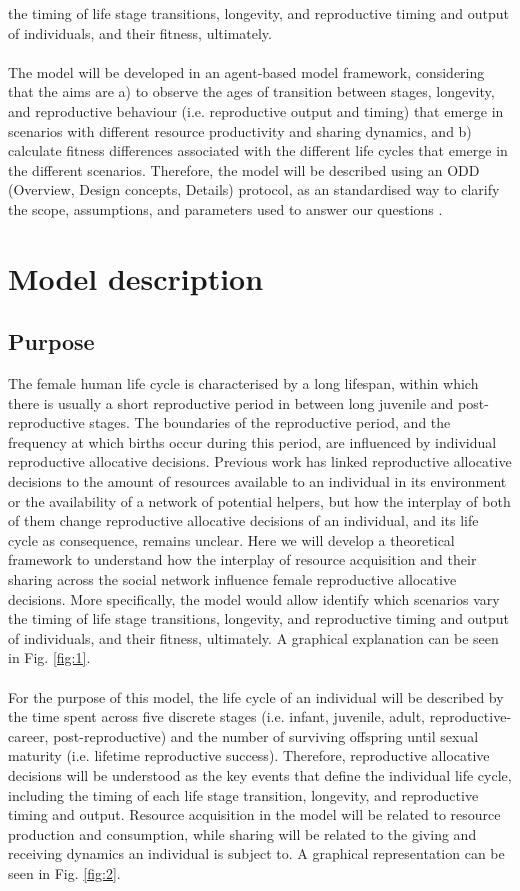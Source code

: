\documentclass{article}
\begin{document}
the timing of life stage transitions, longevity, and reproductive timing and output of individuals, and their fitness, ultimately.
\\\\
The model will be developed in an agent-based model framework, considering that the aims are a) to observe the ages of transition between stages, longevity, and reproductive behaviour (i.e. reproductive output and timing) that emerge in scenarios with different resource productivity and sharing dynamics, and b) calculate fitness differences associated with the different life cycles that emerge in the different scenarios. Therefore, the model will be described using an ODD (Overview, Design concepts, Details) protocol, as an standardised way to clarify the scope, assumptions, and parameters used to answer our questions \citep{grimm2006standard,grimm2020odd}.

\section{Model description}

\subsection{Purpose}

The female human life cycle is characterised by a long lifespan, within which there is usually a short reproductive period in between long juvenile and post-reproductive stages. The boundaries of the reproductive period, and the frequency at which births occur during this period, are influenced by individual reproductive allocative decisions. Previous work has linked reproductive allocative decisions to the amount of resources available to an individual in its environment or the availability of a network of potential helpers, but how the interplay of both of them change reproductive allocative decisions of an individual, and its life cycle as consequence, remains unclear. Here we will develop a theoretical framework to understand how the interplay of resource acquisition and their sharing across the social network influence female reproductive allocative decisions. More specifically, the model would allow identify which scenarios vary the timing of life stage transitions, longevity, and reproductive timing and output of individuals, and their fitness, ultimately. A graphical explanation can be seen in Fig. \ref{fig:1}.
\\\\
For the purpose of this model, the life cycle of an individual will be described by the time spent across five discrete stages (i.e. infant, juvenile, adult, reproductive-career, post-reproductive) and the number of surviving offspring until sexual maturity (i.e. lifetime reproductive success). Therefore, reproductive allocative decisions will be understood as the key events that define the individual life cycle, including the timing of each life stage transition, longevity, and reproductive timing and output. Resource acquisition in the model will be related to resource production and consumption, while sharing will be related to the giving and receiving dynamics an individual is subject to. A graphical representation can be seen in Fig. \ref{fig:2}.
\end{document}
